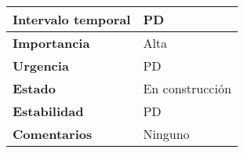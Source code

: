 \begin{table}[H]
\begin{tabular}{|l|l|}
		\textbf{Intervalo temporal}   & PD                                                                  \\ \hline
		\textbf{Importancia}          & Alta                                                                  \\ \hline
		\textbf{Urgencia}             & PD                                                                  \\ \hline
		\textbf{Estado}               & En construcción                                                                  \\ \hline
		\textbf{Estabilidad}          & PD                                                                  \\ \hline
		\textbf{Comentarios}          & Ninguno                                                                  \\ \hline
	\end{tabular}
\end{table}

\vspace{5mm}


